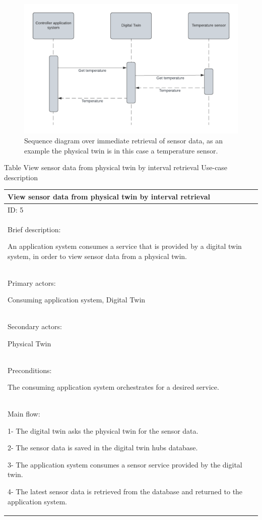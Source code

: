 \documentclass{article}
\newcounter{Table}
\renewcommand\theTable{\arabic{Table}}
\begin{document}
\begin{figure}[H]
    \centering
    \includegraphics[width=\textwidth,height=\textheight,keepaspectratio]{./figures/Sensor-Sequence.png}
    \caption{Sequence diagram over immediate retrieval of sensor data, as an example the physical twin is in this case a temperature sensor.}
    \label{fig:sensor-sequence}
\end{figure}

\newpage

Table \stepcounter{Table}{\theTable} View sensor data from physical twin by interval retrieval Use-case description

\begin{flushleft}
\tablefirsthead{}
\tablehead{}
\tabletail{}
\tablelasttail{}
\begin{supertabular}{|m{6.01226in}|}
\hline
View sensor data from physical twin by interval retrieval\\\hline
ID: 5 \\\hline
Brief description:

An application system consumes a service that is provided by a digital twin system, in order to view sensor data from a physical twin. \\\hline

Primary actors:

Consuming application system, Digital Twin \\\hline
Secondary actors:

Physical Twin \\\hline
Preconditions:

The consuming application system orchestrates for a desired service. \\\hline
Main flow:

1- The digital twin asks the physical twin for the sensor data.

2- The sensor data is saved in the digital twin hubs database.

3- The application system consumes a sensor service provided by the digital twin.

4- The latest sensor data is retrieved from the database and returned to the application system.

\\\hline
\end{supertabular}
\end{flushleft}
\end{document}
